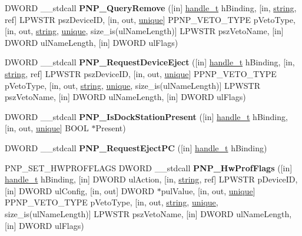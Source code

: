 \begin{DoxyCompactItemize}
\item 
\mbox{\label{interfacepnp_a4d28afaeb52f6ca69486b48770abb067}} 
D\+W\+O\+RD \+\_\+\+\_\+stdcall {\bfseries P\+N\+P\+\_\+\+Query\+Remove} (\mbox{[}in\mbox{]} \hyperlink{interfacevoid}{handle\+\_\+t} h\+Binding, \mbox{[}in, \hyperlink{structstring}{string}, ref\mbox{]} L\+P\+W\+S\+TR psz\+Device\+ID, \mbox{[}in, out, \hyperlink{interfaceunique}{unique}\mbox{]} P\+P\+N\+P\+\_\+\+V\+E\+T\+O\+\_\+\+T\+Y\+PE p\+Veto\+Type, \mbox{[}in, out, \hyperlink{structstring}{string}, \hyperlink{interfaceunique}{unique}, size\+\_\+is(ul\+Name\+Length)\mbox{]} L\+P\+W\+S\+TR psz\+Veto\+Name, \mbox{[}in\mbox{]} D\+W\+O\+RD ul\+Name\+Length, \mbox{[}in\mbox{]} D\+W\+O\+RD ul\+Flags)
\item 
\mbox{\label{interfacepnp_a3a384116e4524209fb32fff1ff12c6a2}} 
D\+W\+O\+RD \+\_\+\+\_\+stdcall {\bfseries P\+N\+P\+\_\+\+Request\+Device\+Eject} (\mbox{[}in\mbox{]} \hyperlink{interfacevoid}{handle\+\_\+t} h\+Binding, \mbox{[}in, \hyperlink{structstring}{string}, ref\mbox{]} L\+P\+W\+S\+TR psz\+Device\+ID, \mbox{[}in, out, \hyperlink{interfaceunique}{unique}\mbox{]} P\+P\+N\+P\+\_\+\+V\+E\+T\+O\+\_\+\+T\+Y\+PE p\+Veto\+Type, \mbox{[}in, out, \hyperlink{structstring}{string}, \hyperlink{interfaceunique}{unique}, size\+\_\+is(ul\+Name\+Length)\mbox{]} L\+P\+W\+S\+TR psz\+Veto\+Name, \mbox{[}in\mbox{]} D\+W\+O\+RD ul\+Name\+Length, \mbox{[}in\mbox{]} D\+W\+O\+RD ul\+Flags)
\item 
\mbox{\label{interfacepnp_ab8a682806fba6ecf0b1e2d5de0836ded}} 
D\+W\+O\+RD \+\_\+\+\_\+stdcall {\bfseries P\+N\+P\+\_\+\+Is\+Dock\+Station\+Present} (\mbox{[}in\mbox{]} \hyperlink{interfacevoid}{handle\+\_\+t} h\+Binding, \mbox{[}in, out, \hyperlink{interfaceunique}{unique}\mbox{]} B\+O\+OL $\ast$Present)
\item 
\mbox{\label{interfacepnp_a0a8a19fbc1cc131df88d328052c3ce68}} 
D\+W\+O\+RD \+\_\+\+\_\+stdcall {\bfseries P\+N\+P\+\_\+\+Request\+Eject\+PC} (\mbox{[}in\mbox{]} \hyperlink{interfacevoid}{handle\+\_\+t} h\+Binding)
\item 
\mbox{\label{interfacepnp_a15fcd1bcc15b31414233a11cd0fe3ad1}} 
P\+N\+P\+\_\+\+S\+E\+T\+\_\+\+H\+W\+P\+R\+O\+F\+F\+L\+A\+GS D\+W\+O\+RD \+\_\+\+\_\+stdcall {\bfseries P\+N\+P\+\_\+\+Hw\+Prof\+Flags} (\mbox{[}in\mbox{]} \hyperlink{interfacevoid}{handle\+\_\+t} h\+Binding, \mbox{[}in\mbox{]} D\+W\+O\+RD ul\+Action, \mbox{[}in, \hyperlink{structstring}{string}, ref\mbox{]} L\+P\+W\+S\+TR p\+Device\+ID, \mbox{[}in\mbox{]} D\+W\+O\+RD ul\+Config, \mbox{[}in, out\mbox{]} D\+W\+O\+RD $\ast$pul\+Value, \mbox{[}in, out, \hyperlink{interfaceunique}{unique}\mbox{]} P\+P\+N\+P\+\_\+\+V\+E\+T\+O\+\_\+\+T\+Y\+PE p\+Veto\+Type, \mbox{[}in, out, \hyperlink{structstring}{string}, \hyperlink{interfaceunique}{unique}, size\+\_\+is(ul\+Name\+Length)\mbox{]} L\+P\+W\+S\+TR psz\+Veto\+Name, \mbox{[}in\mbox{]} D\+W\+O\+RD ul\+Name\+Length, \mbox{[}in\mbox{]} D\+W\+O\+RD ul\+Flags)

\end{DoxyCompactItemize}
